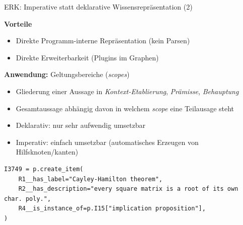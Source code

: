 \documentclass[
	ngerman,
	10pt,				%
	aspectratio=169 	%
]{beamer}
\begin{document}
\begin{frame}[t,fragile,label=erk3]{\large ERK: Imperative statt deklarative Wissensrepräsentation (2)}

\vspace{-2mm}

\textbf{Vorteile}
\begin{itemize}
 \item Direkte Programm-interne Repräsentation (kein Parsen)
 \item Direkte Erweiterbarkeit (Plugins im Graphen)
\end{itemize}

\pause
\bigskip
\textbf{Anwendung:} Geltungsbereiche (\textit{scopes})
\begin{itemize}
 \item Gliederung einer Aussage in \textit{Kontext-Etablierung}, \textit{Prämisse}, \textit{Behauptung}
 \item Gesamtaussage abhängig davon in welchem \textit{scope} eine Teilausage steht
 \item Deklarativ: nur sehr aufwendig umsetzbar
 \item Imperativ: einfach umsetzbar (automatisches Erzeugen von Hilfsknoten/kanten) 
\end{itemize}

\pause

\begin{lstlisting}
I3749 = p.create_item(
    R1__has_label="Cayley-Hamilton theorem",
    R2__has_description="every square matrix is a root of its own char. poly.",
    R4__is_instance_of=p.I15["implication proposition"],
)
\end{lstlisting}





\end{frame}
  
\end{document}
